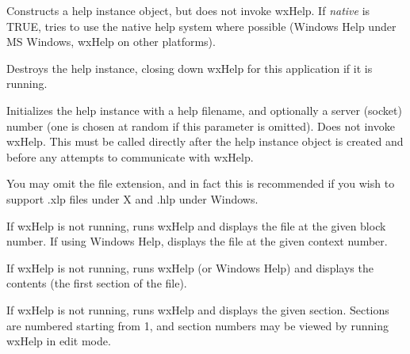 
Constructs a help instance object, but does not invoke wxHelp.
If {\it native} is TRUE, tries to use the native help system where
possible (Windows Help under MS Windows, wxHelp on other platforms).



Destroys the help instance, closing down wxHelp for this application
if it is running.



Initializes the help instance with a help filename, and optionally a server (socket)
number (one is chosen at random if this parameter is omitted). Does not invoke wxHelp.
This must be called directly after the help instance object is created and before
any attempts to communicate with wxHelp.

You may omit the file extension, and in fact this is recommended if you
wish to support .xlp files under X and .hlp under Windows.



If wxHelp is not running, runs wxHelp and displays the file at the given block number.
If using Windows Help, displays the file at the given context number.



If wxHelp is not running, runs wxHelp (or Windows Help) and displays the
contents (the first section of the file).



If wxHelp is not running, runs wxHelp and displays the given section.
Sections are numbered starting from 1, and section numbers may be viewed by running
wxHelp in edit mode.



